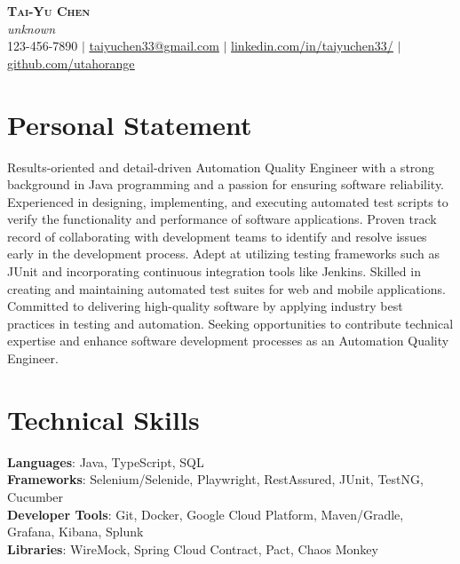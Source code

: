 \documentclass[letterpaper,11pt]{article}
\begin{document}

\begin{center}
    \textbf{\Huge \scshape Tai-Yu Chen} \\ \vspace{1pt}
    \small \textit{unknown} \\
    123-456-7890 $|$ \href{mailto:taiyuchen33@gmail.com}{\underline{taiyuchen33@gmail.com}} $|$ 
    \href{https://www.linkedin.com/in/taiyuchen33/}{\underline{linkedin.com/in/taiyuchen33/}} $|$
    \href{https://github.com/utahorange}{\underline{github.com/utahorange}}
\end{center}

\section*{Personal Statement}
Results-oriented and detail-driven Automation Quality Engineer with a strong background in Java programming and a passion for ensuring software reliability. Experienced in designing, implementing, and executing automated test scripts to verify the functionality and performance of software applications. Proven track record of collaborating with development teams to identify and resolve issues early in the development process. Adept at utilizing testing frameworks such as JUnit and incorporating continuous integration tools like Jenkins. Skilled in creating and maintaining automated test suites for web and mobile applications. Committed to delivering high-quality software by applying industry best practices in testing and automation. Seeking opportunities to contribute technical expertise and enhance software development processes as an Automation Quality Engineer.

\section{Technical Skills}
 \begin{itemize}[leftmargin=0.15in, label={}]
    \small{\item{
     \textbf{Languages}{: Java, TypeScript, SQL} \\
     \textbf{Frameworks}{: Selenium/Selenide, Playwright, RestAssured, JUnit, TestNG, Cucumber} \\
     \textbf{Developer Tools}{: Git, Docker, Google Cloud Platform, Maven/Gradle, Grafana, Kibana, Splunk} \\
     \textbf{Libraries}{: WireMock, Spring Cloud Contract, Pact, Chaos Monkey}
    }}
 \end{itemize}
\end{document}
